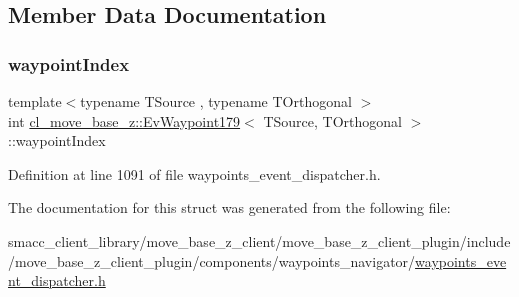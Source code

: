 \subsection{Member Data Documentation}
\mbox{\label{structcl__move__base__z_1_1EvWaypoint179_a2bf995bcbd92aa3ba4f90f37f0b05f1a}} 
\subsubsection{\texorpdfstring{waypoint\+Index}{waypointIndex}}
{\footnotesize\ttfamily template$<$typename T\+Source , typename T\+Orthogonal $>$ \\
int \hyperlink{structcl__move__base__z_1_1EvWaypoint179}{cl\+\_\+move\+\_\+base\+\_\+z\+::\+Ev\+Waypoint179}$<$ T\+Source, T\+Orthogonal $>$\+::waypoint\+Index}



Definition at line 1091 of file waypoints\+\_\+event\+\_\+dispatcher.\+h.



The documentation for this struct was generated from the following file\+:\begin{DoxyCompactItemize}
\item 
smacc\+\_\+client\+\_\+library/move\+\_\+base\+\_\+z\+\_\+client/move\+\_\+base\+\_\+z\+\_\+client\+\_\+plugin/include/move\+\_\+base\+\_\+z\+\_\+client\+\_\+plugin/components/waypoints\+\_\+navigator/\hyperlink{waypoints__event__dispatcher_8h}{waypoints\+\_\+event\+\_\+dispatcher.\+h}\end{DoxyCompactItemize}
